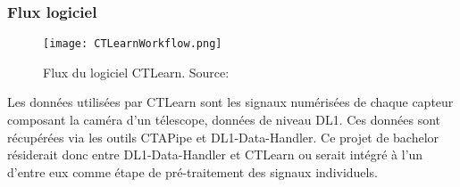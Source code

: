 \subsubsection{Flux logiciel}

\begin{figure}[tbph!]
	\centering
	\texttt{[image: CTLearnWorkflow.png]}
	\caption[Flux du logiciel CTLearn]{Flux du logiciel CTLearn. Source: \cite{CTLearnWorkflow}}
\end{figure}

Les données utilisées par CTLearn sont les signaux numérisées de chaque capteur composant la caméra d'un télescope, données de niveau DL1.
Ces données sont récupérées via les outils CTAPipe et DL1-Data-Handler. 
Ce projet de bachelor résiderait donc entre DL1-Data-Handler et CTLearn ou serait intégré à l'un d'entre eux comme étape de pré-traitement des signaux individuels.